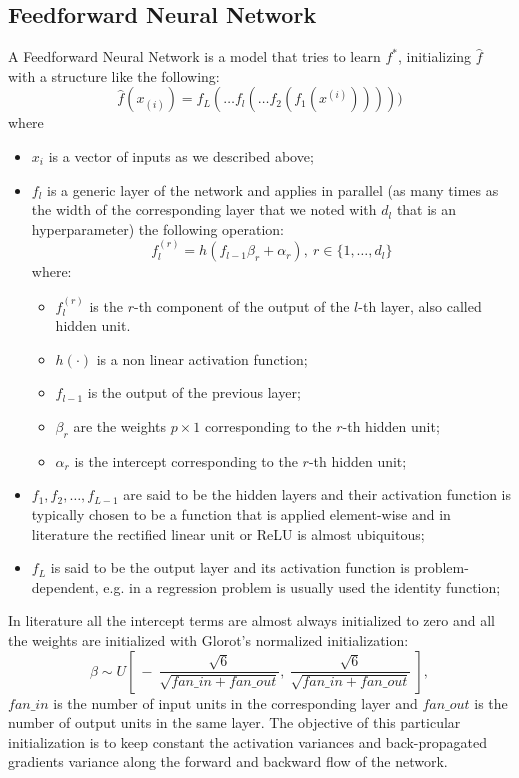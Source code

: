 \documentclass{article}
\begin{document}
\subsection{Feedforward Neural Network}
A Feedforward Neural Network is a model that tries to learn $f^*$, initializing $\hat{f}$ with a structure like the following:
\begin{equation}
    \hat{f}(x_{(i)}) = f_L( \dots f_l ( \dots f_2( f_1(x^{(i)})))))
\end{equation}
where
\begin{itemize}
    \item $x_i$ is a vector of inputs as we described above;
    \item $f_l$ is a generic layer of the network and applies in parallel (as many times as the width of the corresponding layer that we noted with $d_l$ that is an hyperparameter) the following operation:
    \begin{equation}
        f^{(r)}_{l} = h(f_{l-1}\beta_r + \alpha_r),\ r \in \{1, \dots, d_l\}
    \end{equation}
where:
        \begin{itemize}
            \item $f^{(r)}_{l}$ is the $r$-th component of the output of the $l$-th layer, also called hidden unit.
            \item $h(\cdot)$ is a non linear activation function;
            \item $f_{l-1}$ is the output of the previous layer;
            \item $\beta_r$ are the weights $p \times 1$ corresponding to the $r$-th hidden unit;
            \item $\alpha_r$ is the intercept corresponding to the $r$-th hidden unit;
        \end{itemize}
    \item $f_1, f_2, \dots, f_{L - 1}$ are said to be the hidden layers and their activation function is typically chosen to be a function that is applied element-wise and in literature the rectified linear unit or ReLU\cite{relu} is almost ubiquitous;
    \item $f_L$ is said to be the output layer and its activation function is problem-dependent, e.g. in a regression problem is usually used the identity function;
\end{itemize}

In literature all the intercept terms are almost always initialized to zero and all the weights are initialized with Glorot's normalized initialization\cite{glorot}:
\begin{equation}
    \beta \sim U\left[\ -\ \frac{\sqrt{6}}{\sqrt{fan\_in + fan\_out}},\ \frac{\sqrt{6}}{\sqrt{fan\_in + fan\_out}}\ \right],
\end{equation}
$fan\_in$ is the number of input units in the corresponding layer and $fan\_out$ is the number of output units in the same layer.
The objective of this particular initialization is to keep constant the activation variances and back-propagated gradients variance along the forward and backward flow of the network.
\end{document}

